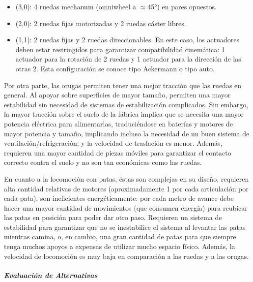 \begin{itemize}
	\begin{itemize}
		\item (3,0): 4 ruedas mechanum (omniwheel a $\approx$45°) en pares opuestos.
		\item (2,0): 2 ruedas fijas motorizadas y 2 ruedas cáster libres.
		\item(1,1): 2 ruedas fijas y 2 ruedas direccionables. En este caso, los actuadores deben estar restringidos para garantizar compatibilidad cinemática: 1 actuador para la rotación de 2 ruedas y 1 actuador para la dirección de las otras 2. Esta configuración se conoce tipo Ackermann o tipo auto.
	\end{itemize}
\end{itemize}

Por otra parte, las orugas permiten tener una mejor tracción que las ruedas en general. Al apoyar sobre superficies de mayor tamaño, permiten una mayor estabilidad sin necesidad de sistemas de estabilización complicados. Sin embargo, la mayor tracción sobre el suelo de la fábrica implica que se necesita una mayor potencia eléctrica para alimentarlas, traduciéndose en baterías y motores de mayor potencia y tamaño, implicando incluso la necesidad de un buen sistema de ventilación/refrigeración; y la velocidad de traslación es menor. Además, requieren una mayor cantidad de piezas móviles para garantizar el contacto correcto contra el suelo y no son tan económicas como las ruedas.

En cuanto a la locomoción con patas, éstas son complejas en su diseño, requieren alta cantidad relativas de motores (aproximadamente 1 por cada articulación por cada pata), son ineficientes energéticamente: por cada metro de avance debe hacer una mayor cantidad de movimientos (que consumen energía) para reubicar las patas en posición para poder dar otro paso. Requieren un sistema de estabilidad para garantizar que no se inestabilice el sistema al levantar las patas mientras camina, o, en cambio, una gran cantidad de patas para que siempre tenga muchos apoyos a expensas de utilizar mucho espacio físico. Además, la velocidad de locomoción es muy baja en comparación a las ruedas y a las orugas.

\subparagraph{Evaluación de Alternativas} \label{ev:sistloc}

